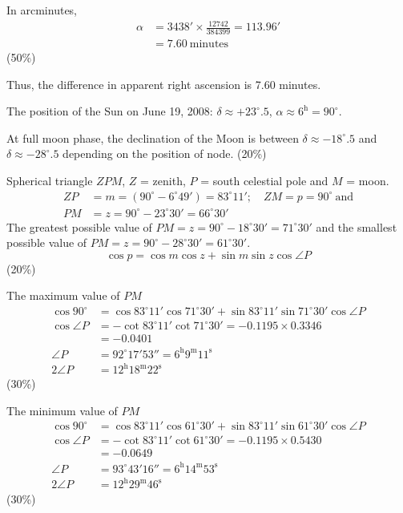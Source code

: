In arcminutes,
\begin{align*}
  \alpha &= 3438' \times \frac{12742}{384399} = 113.96' \\
  &= 7.60\ \text{minutes}
\end{align*}
\hfill(50\%)

Thus, the difference in apparent right ascension is 7.60 minutes.

The position of the Sun on June 19, 2008:
$\delta \approx +23^\circ\!.5$, $\alpha \approx 6^{\mathrm{h}} = 90^\circ$.

At full moon phase, the declination of the Moon is between
$\delta \approx -18^\circ\!.5$ and $\delta \approx -28^\circ\!.5$ depending on
the position of node. \hfill(20\%)


Spherical triangle $ZPM$, $Z$ = zenith, $P$ = south celestial pole and
$M$ = moon.
\begin{align*}
  ZP &= m = (90^\circ - 6^\circ 49') = 83^\circ 11';\quad
  ZM = p = 90^\circ\ \text{and} \\
  PM &= z = 90^\circ - 23^\circ 30' = 66^\circ 30'
\end{align*}
The greatest possible value of $PM = z = 90^\circ - 18^\circ 30' = 71^\circ 30'$
and the smallest possible value of $PM = z = 90^\circ - 28^\circ 30'
= 61^\circ 30'$.
\[
  \cos p = \cos m \cos z + \sin m \sin z \cos\angle P
\]
\hfill(20\%)

The maximum value of $PM$
\begin{align*}
  \cos 90^\circ &= \cos 83^\circ 11' \cos 71^\circ 30'
    + \sin 83^\circ 11' \sin 71^\circ 30' \cos\angle P \\
  \cos\angle P &= -\cot 83^\circ 11' \cot 71^\circ 30'
    = -0.1195 \times 0.3346 \\
  &= -0.0401 \\
  \angle P &= 92^\circ 17' 53'' = 6^{\mathrm{h}} 9^{\mathrm{m}} 11^{\mathrm{s}} \\
  2\angle P &= 12^{\mathrm{h}} 18^{\mathrm{m}} 22^{\mathrm{s}}
\end{align*}
\hfill(30\%)

The minimum value of $PM$
\begin{align*}
  \cos 90^\circ &= \cos 83^\circ 11' \cos 61^\circ 30'
    + \sin 83^\circ 11' \sin 61^\circ 30' \cos\angle P \\
  \cos\angle P &= -\cot 83^\circ 11' \cot 61^\circ 30'
    = -0.1195 \times 0.5430 \\
  &= -0.0649 \\
  \angle P &= 93^\circ 43' 16'' = 6^{\mathrm{h}} 14^{\mathrm{m}} 53^{\mathrm{s}} \\
  2\angle P &= 12^{\mathrm{h}} 29^{\mathrm{m}} 46^{\mathrm{s}}
\end{align*}
\hfill(30\%)


